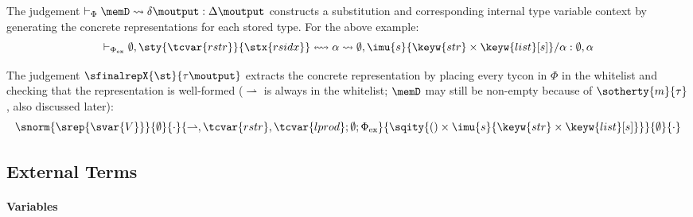 The judgement $\vdash_\Phi \memD \leadsto \delta\moutput : \Delta\moutput$ constructs a substitution and corresponding internal type variable context by generating the concrete representations for each stored type. For the above example: \[\vdash_{\Phi_\text{ex}} \emptyset, \sty{\tcvar{rstr}}{\stx{rsidx}} \leftrightsquigarrow \alpha \leadsto \emptyset, \imu{s}{\keyw{str} \times \keyw{list}[s]}/\alpha : \emptyset, \alpha\]

The judgement $\sfinalrepX{\st}{\tau\moutput}$ extracts the concrete representation by placing every tycon in $\Phi$ in the whitelist and checking that the representation is well-formed (${\rightharpoonup}$ is always in the whitelist; $\memD$ may still be non-empty because of $\sotherty{m}{\tau}$, also discussed later):\[\snorm{\srep{\svar{V}}}{\emptyset}{\cdot}{{\rightharpoonup},\tcvar{rstr},\tcvar{lprod}; \emptyset; \Phi_\text{ex}}{\sqity{\iunit\times\imu{s}{\keyw{str}\times\keyw{list}[s]}}}{\emptyset}{\cdot}\]%
\subsection{External Terms}
\paragraph{Variables}

